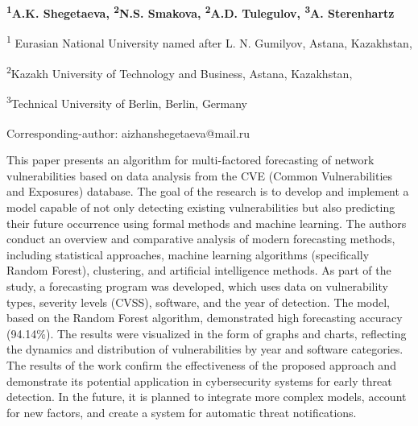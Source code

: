 
\begin{articleheader}

{\bfseries
\textsuperscript{1}A.K. Shegetaeva\textsuperscript{\envelope },
\textsuperscript{2}N.S. Smakova,
\textsuperscript{2}A.D. Tulegulov,
\textsuperscript{3}A. Sterenhartz
}
\end{articleheader}

\begin{affiliation}
\textsuperscript{1} Eurasian National University named after L. N. Gumilyov, Astana, Kazakhstan,

\textsuperscript{2}Kazakh University of Technology and Business, Astana, Kazakhstan,

\textsuperscript{3}Technical University of Berlin, Berlin, Germany

\raggedright \textsuperscript{\envelope }Corresponding-author: aizhanshegetaeva@mail.ru
\end{affiliation}

This paper presents an algorithm for multi-factored forecasting of
network vulnerabilities based on data analysis from the CVE (Common
Vulnerabilities and Exposures) database. The goal of the research is to
develop and implement a model capable of not only detecting existing
vulnerabilities but also predicting their future occurrence using formal
methods and machine learning. The authors conduct an overview and
comparative analysis of modern forecasting methods, including
statistical approaches, machine learning algorithms (specifically Random
Forest), clustering, and artificial intelligence methods. As part of the
study, a forecasting program was developed, which uses data on
vulnerability types, severity levels (CVSS), software, and the year of
detection. The model, based on the Random Forest algorithm, demonstrated
high forecasting accuracy (94.14\%). The results were visualized in the
form of graphs and charts, reflecting the dynamics and distribution of
vulnerabilities by year and software categories. The results of the work
confirm the effectiveness of the proposed approach and demonstrate its
potential application in cybersecur\-ity systems for early threat
detection. In the future, it is planned to integrate more complex
models, account for new factors, and create a system for automatic
threat notifications.

